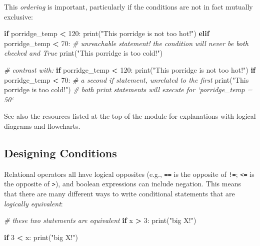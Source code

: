 \documentclass[]{book}
\newenvironment{Shaded}{\begin{snugshade}}{\end{snugshade}}
\newcommand{\DecValTok}[1]{\textcolor[rgb]{0.00,0.00,0.81}{#1}}
\newcommand{\StringTok}[1]{\textcolor[rgb]{0.31,0.60,0.02}{#1}}
\newcommand{\CommentTok}[1]{\textcolor[rgb]{0.56,0.35,0.01}{\textit{#1}}}
\newcommand{\ControlFlowTok}[1]{\textcolor[rgb]{0.13,0.29,0.53}{\textbf{#1}}}
\newcommand{\OperatorTok}[1]{\textcolor[rgb]{0.81,0.36,0.00}{\textbf{#1}}}
\newcommand{\BuiltInTok}[1]{#1}
\newcommand{\NormalTok}[1]{#1}
\begin{document}
This \emph{ordering} is important, particularly if the conditions are
not in fact mutually exclusive:

\begin{Shaded}
\begin{Highlighting}[]
\ControlFlowTok{if}\NormalTok{ porridge_temp }\OperatorTok{<} \DecValTok{120}\NormalTok{:}
    \BuiltInTok{print}\NormalTok{(}\StringTok{"This porridge is not too hot!"}\NormalTok{)}
\ControlFlowTok{elif}\NormalTok{ porridge_temp }\OperatorTok{<} \DecValTok{70}\NormalTok{:}
  \CommentTok{# unreachable statement! the condition will never be both checked and True}
    \BuiltInTok{print}\NormalTok{(}\StringTok{"This porridge is too cold!"}\NormalTok{)}

\CommentTok{# contrast with:}
\ControlFlowTok{if}\NormalTok{ porridge_temp }\OperatorTok{<} \DecValTok{120}\NormalTok{:}
    \BuiltInTok{print}\NormalTok{(}\StringTok{"This porridge is not too hot!"}\NormalTok{)}
\ControlFlowTok{if}\NormalTok{ porridge_temp }\OperatorTok{<} \DecValTok{70}\NormalTok{:  }\CommentTok{# a second if statement, unrelated to the first}
    \BuiltInTok{print}\NormalTok{(}\StringTok{"This porridge is too cold!"}\NormalTok{)}
\CommentTok{# both print statements will execute for `porridge_temp = 50`}
\end{Highlighting}
\end{Shaded}

See also the resources listed at the top of the module for explanations
with logical diagrams and flowcharts.

\hypertarget{designing-conditions}{\subsection{Designing
Conditions}\label{designing-conditions}}

Relational operators all have logical opposites (e.g., \texttt{==} is
the opposite of \texttt{!=}; \texttt{\textless{}=} is the opposite of
\texttt{\textgreater{}}), and boolean expressions can include negation.
This means that there are many different ways to write conditional
statements that are \emph{logically equivalent}:

\begin{Shaded}
\begin{Highlighting}[]
\CommentTok{# these two statements are equivalent}
\ControlFlowTok{if}\NormalTok{ x }\OperatorTok{>} \DecValTok{3}\NormalTok{:}
    \BuiltInTok{print}\NormalTok{(}\StringTok{"big X!"}\NormalTok{)}

\ControlFlowTok{if} \DecValTok{3} \OperatorTok{<}\NormalTok{ x:}
    \BuiltInTok{print}\NormalTok{(}\StringTok{"big X!"}\NormalTok{)}
\end{Highlighting}
\end{Shaded}
\end{document}

